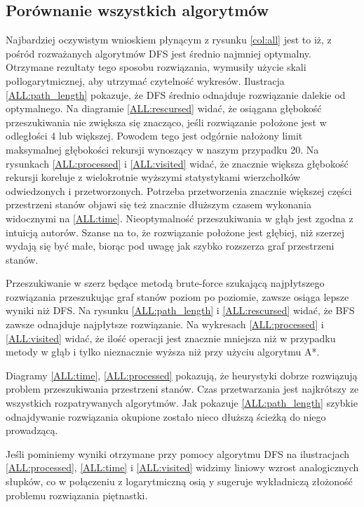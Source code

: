 \documentclass{classrep}
\begin{document}
\subsection{Porównanie wszystkich algorytmów}
Najbardziej oczywistym wnioskiem płynącym z rysunku \ref{col:all} jest to iż, z pośród rozważanych algorytmów DFS jest średnio najmniej optymalny.
Otrzymane rezultaty tego sposobu rozwiązania, wymusiły użycie skali połlogarytmicznej, aby utrzymać czytelność wykresów.
Ilustracja \ref{ALL:path_length} pokazuje, że DFS średnio odnajduje rozwiązanie dalekie od optymalnego.
Na diagramie \ref{ALL:rescursed} widać, że osiągana głębokość przeszukiwania nie zwiększa się znacząco, jeśli rozwiązanie położone jest w odległości 4 lub większej.
Powodem tego jest odgórnie nałożony limit maksymalnej głębokości rekursji wynoszący w naszym przypadku 20.
Na rysunkach \ref{ALL:processed} i \ref{ALL:visited} widać, że znacznie większa głębokość rekursji koreluje z wielokrotnie wyższymi statystykami wierzchołków odwiedzonych i przetworzonych.
Potrzeba przetworzenia znacznie większej części przestrzeni stanów objawi się też znacznie dłuższym czasem wykonania widocznymi na \ref{ALL:time}.
Nieoptymalność przeszukiwania w głąb jest zgodna z intuicją autorów.
Szanse na to, że rozwiązanie położone jest głębiej, niż szerzej wydają się być małe, biorąc pod uwagę jak szybko rozszerza graf przestrzeni stanów.


Przeszukiwanie w szerz będące metodą brute-force szukającą najpłytszego rozwiązania przeszukując graf stanów poziom po poziomie, zawsze osiąga lepsze wyniki niż DFS.
Na rysunku \ref{ALL:path_length} i \ref{ALL:rescursed} widać, że BFS zawsze odnajduje najpłytsze rozwiązanie. Na wykresach \ref{ALL:processed} i \ref{ALL:visited} widać, że ilość operacji jest znacznie mniejsza niż w przypadku metody w głąb i tylko nieznacznie wyższa niż przy użyciu algorytmu A*.


Diagramy \ref{ALL:time}, \ref{ALL:processed} pokazują, że heurystyki dobrze rozwiązują problem przeszukiwania przestrzeni stanów. 
Czas przetwarzania jest najkrótszy ze wszystkich rozpatrywanych algorytmów.
Jak pokazuje \ref{ALL:path_length} szybkie odnajdywanie rozwiązania okupione zostało nieco dłuższą ścieżką do niego prowadzącą.


Jeśli pominiemy wyniki otrzymane przy pomocy algorytmu DFS na ilustracjach \ref{ALL:processed}, \ref{ALL:time} i \ref{ALL:visited} widzimy liniowy wzrost analogicznych słupków, co w połączeniu z logarytmiczną osią y sugeruje wykładniczą złożoność problemu rozwiązania piętnastki. 
\end{document}
